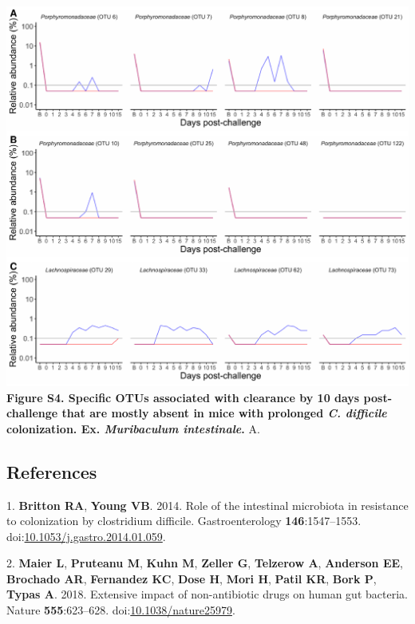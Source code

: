 \documentclass[
  11pt,
]{article}
\begin{document}
\includegraphics{figure_S4.pdf} \textbf{Figure S4. Specific OTUs
associated with clearance by 10 days post-challenge that are mostly
absent in mice with prolonged \emph{C. difficile} colonization. Ex.
\emph{Muribaculum intestinale}.} A. \newpage

\hypertarget{references}{%
\subsection*{References}\label{references}}

\hypertarget{refs}{}
\leavevmode\hypertarget{ref-Britton2014}{}%
1. \textbf{Britton RA}, \textbf{Young VB}. 2014. Role of the intestinal
microbiota in resistance to colonization by clostridium difficile.
Gastroenterology \textbf{146}:1547--1553.
doi:\href{https://doi.org/10.1053/j.gastro.2014.01.059}{10.1053/j.gastro.2014.01.059}.

\leavevmode\hypertarget{ref-Maier2018}{}%
2. \textbf{Maier L}, \textbf{Pruteanu M}, \textbf{Kuhn M},
\textbf{Zeller G}, \textbf{Telzerow A}, \textbf{Anderson EE},
\textbf{Brochado AR}, \textbf{Fernandez KC}, \textbf{Dose H},
\textbf{Mori H}, \textbf{Patil KR}, \textbf{Bork P}, \textbf{Typas A}.
2018. Extensive impact of non-antibiotic drugs on human gut bacteria.
Nature \textbf{555}:623--628.
doi:\href{https://doi.org/10.1038/nature25979}{10.1038/nature25979}.
\end{document}

